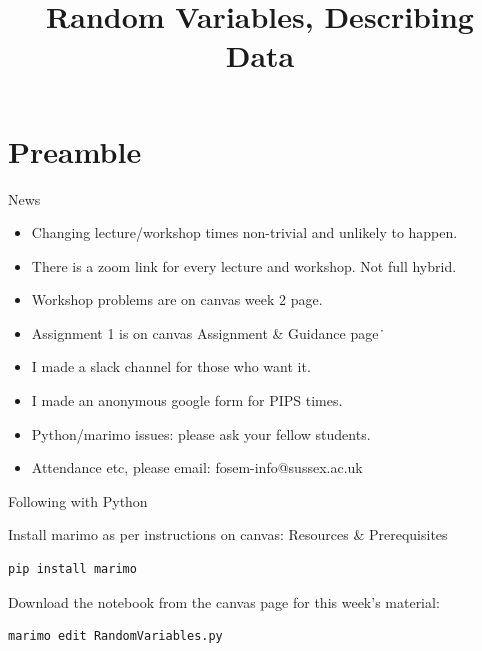 \documentclass[10pt,sans,english,compress,xcolor=dvipsnames]{beamer}
\title[RVs and Data]{Random Variables, Describing Data}
\date{}
\begin{document}

\renewcommand{\boo}[1]{\textbf{\textcolor{red}{#1}}}


\begin{frame}
\titlepage
\end{frame} 

\section*{Preamble}

\begin{frame}[fragile]{News}

\begin{itemize}
\item Changing lecture/workshop times non-trivial and unlikely to happen.\\
\item There is a zoom link for every lecture and workshop. Not full hybrid.\\
\item Workshop problems are on canvas week 2 page.\\
\item Assignment 1 is on canvas Assignment \& Guidance page\.\
\item I made a slack channel for those who want it.\\
\item I made an anonymous google form for PIPS times.\\
\item Python/marimo  issues: please ask your fellow students.\\
\item Attendance etc, please email: fosem-info@sussex.ac.uk \\
\end{itemize}




\end{frame} 


\begin{frame}[fragile]{Following with Python}

Install marimo as per instructions on canvas: Resources \& Prerequisites\\[1ex]

\begin{verbatim}
pip install marimo
\end{verbatim}

Download the notebook from the canvas page for this week's material:  \\[1ex]

\begin{verbatim}
marimo edit RandomVariables.py
\end{verbatim}

\end{frame} 
\end{document}
